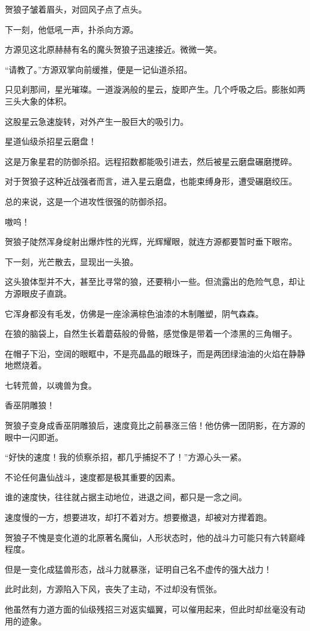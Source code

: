 \begin{this_body}
贺狼子皱着眉头，对回风子点了点头。

下一刻，他低吼一声，扑杀向方源。

方源见这北原赫赫有名的魔头贺狼子迅速接近。微微一笑。

“请教了。”方源双掌向前缓推，便是一记仙道杀招。

只见刹那间，星光璀璨。一道漩涡般的星云，旋即产生。几个呼吸之后。膨胀如两三头大象的体积。

这股星云急速旋转，对外产生一股巨大的吸引力。

星道仙级杀招星云磨盘！

这是万象星君的防御杀招。远程招数都能吸引进去，然后被星云磨盘碾磨搅碎。

对于贺狼子这种近战强者而言，进入星云磨盘，也能束缚身形，遭受碾磨绞压。

总的来说，这是一个进攻性很强的防御杀招。

嗷呜！

贺狼子陡然浑身绽射出爆炸性的光辉，光辉耀眼，就连方源都要暂时垂下眼帘。

下一刻，光芒散去，显现出一头狼。

这头狼体型并不大，甚至比寻常的狼，还要稍小一些。但流露出的危险气息，却让方源眼皮子直跳。

它浑身都没有毛发，仿佛是一座涂满棕色油漆的木制雕塑，阴气森森。

在狼的脑袋上，自然生长着蘑菇般的骨骼，感觉像是带着一个漆黑的三角帽子。

在帽子下沿，空阔的眼眶中，不是亮晶晶的眼珠子，而是两团绿油油的火焰在静静地燃烧着。

七转荒兽，以魂兽为食。

香巫阴雕狼！

贺狼子变身成香巫阴雕狼后，速度竟比之前暴涨三倍！他仿佛一团阴影，在方源的眼中一闪即逝。

“好快的速度！我的侦察杀招，都几乎捕捉不了！”方源心头一紧。

不论任何蛊仙战斗，速度都是极其重要的因素。

谁的速度快，往往就占据主动地位，进退之间，都只是一念之间。

速度慢的一方，想要进攻，却打不着对方。想要撤退，却被对方撵着跑。

贺狼子不愧是变化道的北原著名魔仙，人形状态时，他的战斗力可能只有六转巅峰程度。

但是一变化成猛兽形态，战斗力就暴涨，证明自己名不虚传的强大战力！

此时此刻，方源陷入下风，丧失了主动，不过却没有慌张。

他虽然有力道方面的仙级残招三对返实蝠翼，可以催用起来，但此时却丝毫没有动用的迹象。


\end{this_body}
